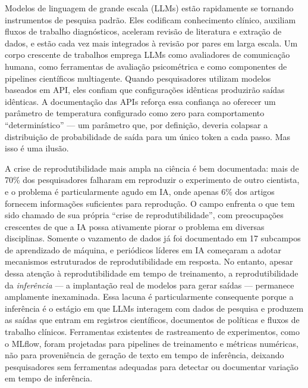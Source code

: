 \documentclass[12pt,a4paper]{article}
\begin{document}
Modelos de linguagem de grande escala (LLMs) estão rapidamente se tornando instrumentos de pesquisa padrão.
Eles codificam conhecimento clínico, auxiliam fluxos de trabalho diagnósticos, aceleram revisão de literatura e extração de dados, e estão cada vez mais integrados à revisão por pares em larga escala.
Um corpo crescente de trabalhos emprega LLMs como avaliadores de comunicação humana, como ferramentas de avaliação psicométrica e como componentes de pipelines científicos multiagente.
Quando pesquisadores utilizam modelos baseados em API, eles confiam que configurações idênticas produzirão saídas idênticas.
A documentação das APIs reforça essa confiança ao oferecer um parâmetro de temperatura configurado como zero para comportamento ``determinístico'' --- um parâmetro que, por definição, deveria colapsar a distribuição de probabilidade de saída para um único token a cada passo.
Mas isso é uma ilusão.

A crise de reprodutibilidade mais ampla na ciência é bem documentada: mais de 70\% dos pesquisadores falharam em reproduzir o experimento de outro cientista, e o problema é particularmente agudo em IA, onde apenas 6\% dos artigos fornecem informações suficientes para reprodução.
O campo enfrenta o que tem sido chamado de sua própria ``crise de reprodutibilidade'', com preocupações crescentes de que a IA possa ativamente piorar o problema em diversas disciplinas.
Somente o vazamento de dados já foi documentado em 17 subcampos de aprendizado de máquina, e periódicos líderes em IA começaram a adotar mecanismos estruturados de reprodutibilidade em resposta.
No entanto, apesar dessa atenção à reprodutibilidade em tempo de treinamento, a reprodutibilidade da \emph{inferência} --- a implantação real de modelos para gerar saídas --- permanece amplamente inexaminada.
Essa lacuna é particularmente consequente porque a inferência é o estágio em que LLMs interagem com dados de pesquisa e produzem as saídas que entram em registros científicos, documentos de políticas e fluxos de trabalho clínicos.
Ferramentas existentes de rastreamento de experimentos, como o MLflow, foram projetadas para pipelines de treinamento e métricas numéricas, não para proveniência de geração de texto em tempo de inferência, deixando pesquisadores sem ferramentas adequadas para detectar ou documentar variação em tempo de inferência.
\end{document}
